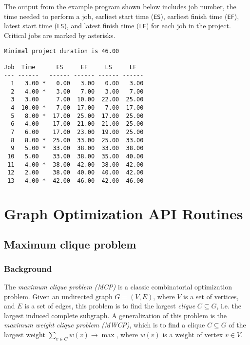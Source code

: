 \documentclass[11pt]{report}
\begin{document}
The output from the example program shown below includes job number,
the time needed to perform a job, earliest start time (\verb|ES|),
earliest finish time (\verb|EF|), latest start time (\verb|LS|), and
latest finish time (\verb|LF|) for each job in the project. Critical
jobs are marked by asterisks.

\begin{footnotesize}
\begin{verbatim}
Minimal project duration is 46.00

Job  Time      ES     EF     LS     LF
--- ------   ------ ------ ------ ------
  1   3.00 *   0.00   3.00   0.00   3.00
  2   4.00 *   3.00   7.00   3.00   7.00
  3   3.00     7.00  10.00  22.00  25.00
  4  10.00 *   7.00  17.00   7.00  17.00
  5   8.00 *  17.00  25.00  17.00  25.00
  6   4.00    17.00  21.00  21.00  25.00
  7   6.00    17.00  23.00  19.00  25.00
  8   8.00 *  25.00  33.00  25.00  33.00
  9   5.00 *  33.00  38.00  33.00  38.00
 10   5.00    33.00  38.00  35.00  40.00
 11   4.00 *  38.00  42.00  38.00  42.00
 12   2.00    38.00  40.00  40.00  42.00
 13   4.00 *  42.00  46.00  42.00  46.00
\end{verbatim}
\end{footnotesize}


\chapter{Graph Optimization API Routines}

\section{Maximum clique problem}

\subsection{Background}

The {\it maximum clique problem (MCP)} is a classic combinatorial
optimization problem. Given an undirected graph $G=(V,E)$, where $V$ is
a set of vertices, and $E$ is a set of edges, this problem is to find
the largest {\it clique} $C\subseteq G$, i.e. the largest induced
complete subgraph. A generalization of this problem is the {\it maximum
weight clique problem (MWCP)}, which is to find a clique $C\subseteq G$
of the largest weight $\displaystyle\sum_{v\in C}w(v)\rightarrow\max$,
where $w(v)$ is a weight of vertex $v\in V$.
\end{document}
